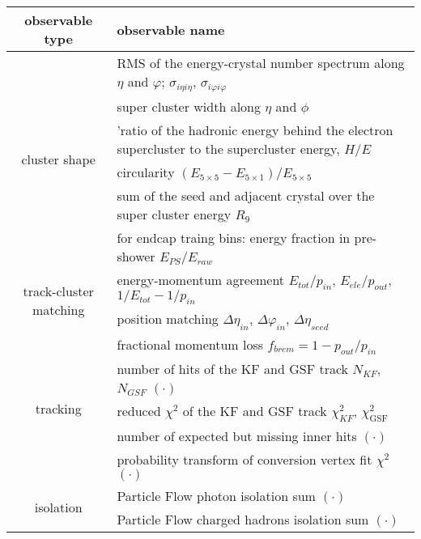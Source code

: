  \begin{table}[h!]
\scriptsize
    \centering
    \begin{tabular}{c|l}
\hline %
\hline %
observable type    &  observable name      	\\
\hline %

\multirow{6}{*}{cluster shape}
	&  RMS of the energy-crystal number spectrum along $\eta$ and $\varphi$; $\sigma_{i\eta i\eta}$, $\sigma_{i\varphi i\varphi}$		\\
	&  super cluster width along $\eta$ and $\phi$		\\
	&  'ratio of the hadronic energy behind the electron 
supercluster to the supercluster energy, $H/E$			\\
	&  circularity $(E_{5\times5} - E_{5\times1})/E_{5\times5}$			\\
	&  sum of the seed and adjacent crystal over the super cluster energy $R_{9}$			\\
	&  for endcap traing bins: energy fraction in pre-shower $E_{PS}/E_{raw}$			\\
\hline
\multirow{2}{*}{track-cluster matching}
	& energy-momentum agreement $E_{tot}/p_{in}$, $E_{ele}/p_{out}$, $1/E_{tot} - 1/p_{in}$ 			\\
	& position matching $\Delta\eta_{in}$, $\Delta\varphi_{in}$, $\Delta\eta_{seed}$			\\
\hline
\multirow{5}{*}{tracking}
        & fractional momentum loss $f_{brem} = 1 - p_{out}/p_{in}$	\\
        & number of hits of the KF and GSF track $N_{KF}$, $N_{GSF}$ $(\mathord{\cdot})$ \\
        & reduced $\chi^2$ of the KF and GSF track $\chi^{2}_{KF}$, $\chi^{2}_{\textrm{GSF}}$ \\
        & number of expected but missing inner hits $(\mathord{\cdot})$ 	\\
        & probability transform of conversion vertex fit $\chi^2$ $(\mathord{\cdot})$ \\
\hline
\multirow{3}{*}{isolation}
& Particle Flow photon isolation sum $(\mathord{\cdot})$ \\
& Particle Flow charged hadrons isolation sum $(\mathord{\cdot})$ \\

\end{tabular}
\end{table}
